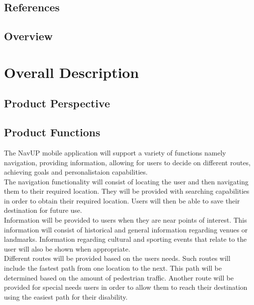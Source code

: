\documentclass[12pt,a4paper]{report}
\begin{document}
	\subsection*{References}
	
	
	\subsection*{Overview}
		

\newpage
\section*{Overall Description}
	\subsection*{Product Perspective}
	\subsection*{Product Functions}
	The NavUP mobile application will support a variety of functions namely navigation, providing information, allowing for users to decide on different routes, achieving goals and personalistaion capabilities.
\\

The navigation functionality will consist of locating the user and then navigating them to their required location. They will be provided with searching capabilities in order to obtain their required location. Users will then be able to save their destination for future use.
\\

Information will be provided to users when they are near points of interest. This information will consist of historical and general information regarding venues or landmarks. Information regarding cultural and sporting events that relate to the user will also be shown when appropriate.
\\

Different routes will be provided based on the users needs. Such routes will include the fastest path from one location to the next. This path will be determined based on the amount of pedestrian traffic. Another route will be provided for special needs users in order to allow them to reach their destination using the easiest path for their disability. 
\\
\end{document}
